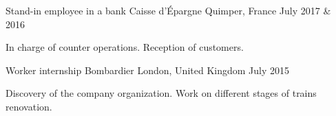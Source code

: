 

\begin{cventries}

  \cventry
    {Stand-in employee in a bank} %
    {Caisse d'Épargne} %
    {Quimper, France} %
    {July 2017 \& 2016} %
    {
      \begin{cvitems} %
        \item {In charge of counter operations. Reception of customers.}
      \end{cvitems}
    } 

  \cventry
    {Worker internship} %
    {Bombardier} %
    {London, United Kingdom} %
    {July 2015} %
    {
      \begin{cvitems} %
        \item {Discovery of the company organization. Work on different stages of trains renovation.}
      \end{cvitems}
    }


\end{cventries}
